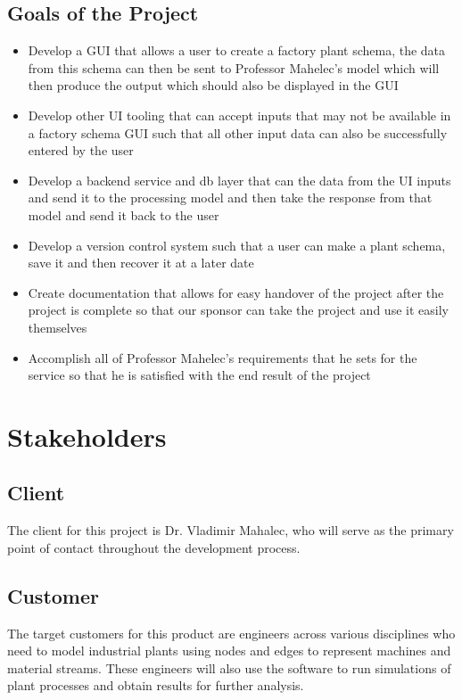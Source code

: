 \documentclass[12pt]{article}
\begin{document}
\subsection{Goals of the Project}
\begin{itemize}
\item Develop a GUI that allows a user to create a factory plant schema, the data from this schema can then be sent to Professor Mahelec's model which will then produce the output which should also be displayed in the GUI
\item Develop other UI tooling that can accept inputs that may not be available in a factory schema GUI such that all other input data can also be successfully entered by the user
\item Develop a backend service and db layer that can the data from the UI inputs and send it to the processing model and then take the response from that model and send it back to the user
\item Develop a version control system such that a user can make a plant schema, save it and then recover it at a later date
\item Create documentation that allows for easy handover of the project after the project is complete so that our sponsor can take the project and use it easily themselves
\item Accomplish all of Professor Mahelec's requirements that he sets for the service so that he is satisfied with the end result of the project
\end{itemize}

\section{Stakeholders}

\subsection{Client} 
The client for this project is Dr. Vladimir Mahalec, who will serve as the primary point of contact throughout the development process.

\subsection{Customer} 
The target customers for this product are engineers across various disciplines who need to model industrial plants using nodes and edges to represent machines and material streams. These engineers will also use the software to run simulations of plant processes and obtain results for further analysis.
\end{document}
